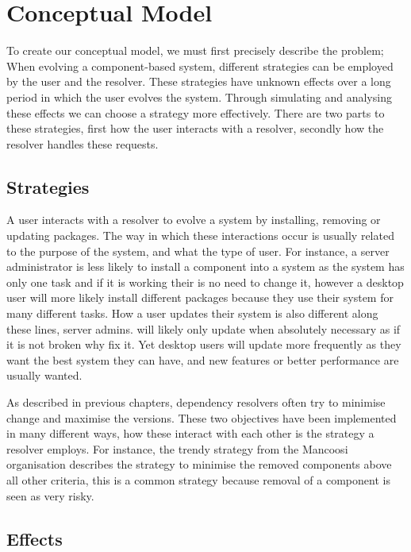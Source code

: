 \section{Conceptual Model}
To create our conceptual model, we must first precisely describe the problem;
{}When evolving a component-based system, different strategies can be employed by the user and the resolver.
{}These strategies have unknown effects over a long period in which the user evolves the system.
{}Through simulating and analysing these effects we can choose a strategy more effectively.
{}There are two parts to these strategies, first how the user interacts with a resolver, secondly how the resolver handles these requests.

\subsection{Strategies}
A user interacts with a resolver to evolve a system by installing, removing or updating packages.
The way in which these interactions occur is usually related to the purpose of the system, and what the type of user.
For instance, a server administrator is less likely to install a component into a system as the system has only one task and if it is working their is no need to change it, 
however a desktop user will more likely install different packages because they use their system for many different tasks.
How a user updates their system is also different along these lines, server admins. will likely only update when absolutely necessary as if it is not broken why fix it.
Yet desktop users will update more frequently as they want the best system they can have, and new features or better performance are usually wanted.

As described in previous chapters, dependency resolvers often try to minimise change and maximise the versions.
These two objectives have been implemented in many different ways, how these interact with each other is the strategy a resolver employs.
For instance, the trendy strategy from the Mancoosi organisation describes the strategy to minimise the removed components above all other criteria,
this is a common strategy because removal of a component is seen as very risky.

\subsection{Effects}

